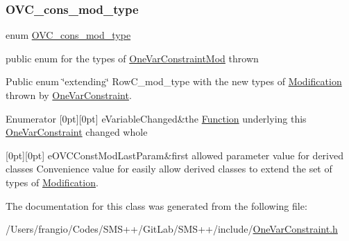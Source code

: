 \subsubsection{\texorpdfstring{O\+V\+C\+\_\+cons\+\_\+mod\+\_\+type}{OVC\_cons\_mod\_type}}
{\footnotesize\ttfamily enum \mbox{\hyperlink{class_s_m_spp__di__unipi__it_1_1_one_var_constraint_mod_a354f6f78be692d52cb82cf60b7d76df5}{O\+V\+C\+\_\+cons\+\_\+mod\+\_\+type}}}



public enum for the types of \mbox{\hyperlink{class_s_m_spp__di__unipi__it_1_1_one_var_constraint_mod}{One\+Var\+Constraint\+Mod}} thrown 

Public enum \char`\"{}extending\char`\"{} Row\+C\+\_\+mod\+\_\+type with the new types of \mbox{\hyperlink{class_s_m_spp__di__unipi__it_1_1_modification}{Modification}} thrown by \mbox{\hyperlink{class_s_m_spp__di__unipi__it_1_1_one_var_constraint}{One\+Var\+Constraint}}. \begin{DoxyEnumFields}{Enumerator}
[0pt][0pt]{}\mbox{\label{class_s_m_spp__di__unipi__it_1_1_one_var_constraint_mod_a354f6f78be692d52cb82cf60b7d76df5ac8b7b788644f69a75175d763fed394e3}} 
e\+Variable\+Changed&the \mbox{\hyperlink{class_s_m_spp__di__unipi__it_1_1_function}{Function}} underlying this \mbox{\hyperlink{class_s_m_spp__di__unipi__it_1_1_one_var_constraint}{One\+Var\+Constraint}} changed whole \\
\hline

[0pt][0pt]{}\mbox{\label{class_s_m_spp__di__unipi__it_1_1_one_var_constraint_mod_a354f6f78be692d52cb82cf60b7d76df5a1c6c25f79cb6b0fc8ffa9a133d5c0fe3}} 
e\+O\+V\+C\+Const\+Mod\+Last\+Param&first allowed parameter value for derived classes Convenience value for easily allow derived classes to extend the set of types of \mbox{\hyperlink{class_s_m_spp__di__unipi__it_1_1_modification}{Modification}}. \\
\hline

\end{DoxyEnumFields}


The documentation for this class was generated from the following file\+:\begin{DoxyCompactItemize}
\item 
/\+Users/frangio/\+Codes/\+S\+M\+S++/\+Git\+Lab/\+S\+M\+S++/include/\mbox{\hyperlink{_one_var_constraint_8h}{One\+Var\+Constraint.\+h}}\end{DoxyCompactItemize}
